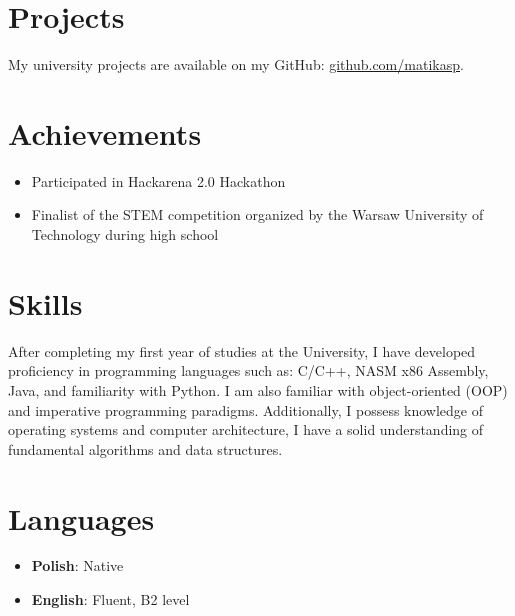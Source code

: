\documentclass[a4paper,10pt]{article}
\begin{document}
\section*{Projects}
My university projects are available on my GitHub: \href{https://github.com/matikasp}{github.com/matikasp}.

\section*{Achievements}
\begin{itemize}[left=0pt]
    \item Participated in Hackarena 2.0 Hackathon
    \item Finalist of the STEM competition organized by the Warsaw University of Technology during high school
\end{itemize}

\section*{Skills}
After completing my first year of studies at the University, I have developed proficiency in programming languages such as: C/C++, NASM x86 Assembly, Java, and familiarity with Python. I am also familiar with object-oriented (OOP) and imperative programming paradigms. Additionally, I possess knowledge of operating systems and computer architecture, I have a solid understanding of fundamental algorithms and data structures.

\section*{Languages}
\begin{itemize}[left=0pt]
    \item \textbf{Polish}: Native
    \item \textbf{English}: Fluent, B2 level
\end{itemize}
\end{document}

